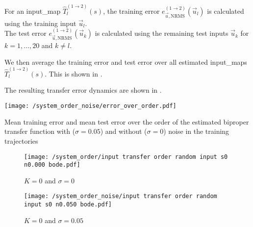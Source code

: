 \begin{example}
    For an \gls*{input_map} $\hat{T}^{(1 \rightarrow 2)}_l(s)$, the training error $e^{(1 \rightarrow 2)}_{\vec{u}, \mathrm{NRMS}}(\vec{u}_l)$ is calculated using the training input $\vec{u}_l$.\\
    The test error $e^{(1 \rightarrow 2)}_{\vec{u}, \mathrm{NRMS}}(\vec{u}_k)$ is calculated using the remaining test inputs $\vec{u}_k$ for $k = 1,\ldots,20$ and $k\neq l$.
    
    We then average the training error and test error over all estimated \glspl*{input_map} 
    $\hat{T}^{(1 \rightarrow 2)}_l(s)$. This is shown in .
    
    The resulting transfer error dynamics are shown in .

\begin{minipage}{1\textwidth}
\begingroup
	\centering
	\vspace{1em}
           \texttt{[image: /system\_order\_noise/error\_over\_order.pdf]}
           \caption[System Order of Transfer Maps Example (Test and Training Errors)]{Mean training error and mean test error over the order of the estimated biproper transfer function with ($\sigma = 0.05$) and without ($\sigma = 0$) noise in the training trajectories}
           \label{figapp:tf_order_error}
       \endgroup
\end{minipage}

    
\begingroup
	\centering	
	\begin{minipage}{1\textwidth}
	\vspace{1em}     
       \begin{subfigure}{0.495\textwidth}
           \centering
           \texttt{[image: /system\_order/input transfer order random input s0 n0.000 bode.pdf]}
           \caption{$K = 0$ and $\sigma = 0$}
           \label{subfigapp:tf_order_a}
       \end{subfigure}
       \hfill
       \begin{subfigure}{0.495\textwidth}
           \centering
           \texttt{[image: /system\_order\_noise/input transfer order random input s0 n0.050 bode.pdf]}
           \caption{$K = 0$ and $\sigma = 0.05$}
           \label{subfigapp:tf_order_b}
       \end{subfigure}
       \hfill 
       

\end{minipage}
\end{example}
